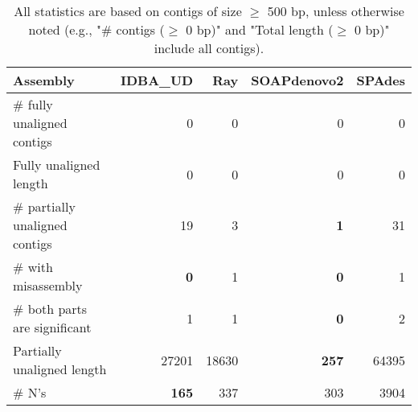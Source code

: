 \documentclass[12pt,a4paper]{article}
\begin{document}
\begin{table}[ht]
\begin{center}
\caption{All statistics are based on contigs of size $\geq$ 500 bp, unless otherwise noted (e.g., "\# contigs ($\geq$ 0 bp)" and "Total length ($\geq$ 0 bp)" include all contigs).}
\begin{tabular}{|l*{4}{|r}|}
\hline
Assembly & IDBA\_UD & Ray & SOAPdenovo2 & SPAdes \\ \hline
\# fully unaligned contigs & 0 & 0 & 0 & 0 \\ \hline
Fully unaligned length & 0 & 0 & 0 & 0 \\ \hline
\# partially unaligned contigs & 19 & 3 & {\bf 1} & 31 \\ \hline
\hspace{5mm}\# with misassembly & {\bf 0} & 1 & {\bf 0} & 1 \\ \hline
\hspace{5mm}\# both parts are significant & 1 & 1 & {\bf 0} & 2 \\ \hline
Partially unaligned length & 27201 & 18630 & {\bf 257} & 64395 \\ \hline
\# N's & {\bf 165} & 337 & 303 & 3904 \\ \hline
\end{tabular}
\end{center}
\end{table}
\end{document}
